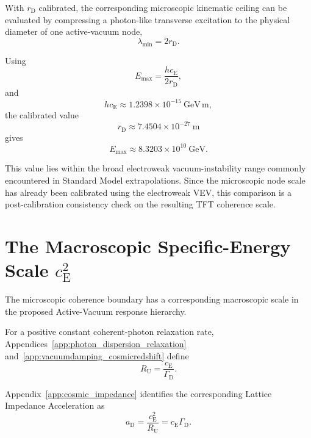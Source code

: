 With $r_{\mathrm D}$ calibrated, the corresponding microscopic kinematic
ceiling can be evaluated by compressing a photon-like transverse excitation to
the physical diameter of one active-vacuum node,
\begin{equation}
    \lambda_{\mathrm{min}}
    =
    2r_{\mathrm D}.
\end{equation}

Using
\begin{equation}
    \boxed{
    E_{\mathrm{max}}
    =
    \frac{
        hc_{\mathrm E}
    }{
        2r_{\mathrm D}
    },
    }
\end{equation}
and
\begin{equation}
    hc_{\mathrm E}
    \approx
    1.2398\times10^{-15}
    ~\mathrm{GeV\,m},
\end{equation}
the calibrated value
\begin{equation}
    r_{\mathrm D}
    \approx
    7.4504\times10^{-27}~\mathrm m
\end{equation}
gives
\begin{equation}
    \boxed{
    E_{\mathrm{max}}
    \approx
    8.3203\times10^{10}~\mathrm{GeV}.
    }
\end{equation}

This value lies within the broad electroweak vacuum-instability range commonly
encountered in Standard Model extrapolations. Since the microscopic node scale
has already been calibrated using the electroweak VEV, this comparison is a
post-calibration consistency check on the resulting TFT coherence scale.


\section{The Macroscopic Specific-Energy Scale
\texorpdfstring{$c_{\mathrm E}^{2}$}{cE2}}
\label{sec:macroscopic_strain_limit}

The microscopic coherence boundary has a corresponding macroscopic scale in
the proposed Active-Vacuum response hierarchy.

For a positive constant coherent-photon relaxation rate,
Appendices~\ref{app:photon_dispersion_relaxation}
and~\ref{app:vacuumdamping_cosmicredshift} define
\begin{equation}
    \boxed{
    R_{\mathrm U}
    =
    \frac{
        c_{\mathrm E}
    }{
        \Gamma_{\mathrm D}
    }.
    }
\end{equation}

Appendix~\ref{app:cosmic_impedance} identifies the corresponding Lattice
Impedance Acceleration as
\begin{equation}
    \boxed{
    a_{\mathrm D}
    =
    \frac{
        c_{\mathrm E}^{2}
    }{
        R_{\mathrm U}
    }
    =
    c_{\mathrm E}\Gamma_{\mathrm D}.
    }
\end{equation}

